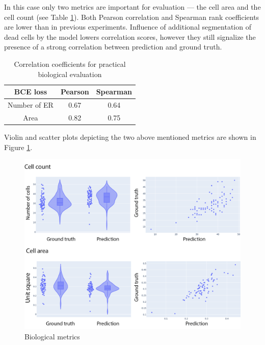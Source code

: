 In this case only two metrics are important for evaluation --- the cell area and the cell count (see Table \ref{table:gfp-metrics}). Both Pearson correlation and Spearman rank coefficients are lower than in previous experiments. Influence of additional segmentation of dead cells by the model lowers correlation scores, however they still signalize the presence of a strong correlation between prediction and ground truth. 
\begin{table}[H]
    \centering
    \caption{Correlation coefficients for practical biological evaluation}
        \begin{adjustbox}{width=0.4\textwidth}
            \begin{tabular}{|c|c|c|}\hline
                BCE loss&Pearson&Spearman
                \\\hline\hline
                Number of ER&0.67&0.64\\\hline
                Area&0.82&0.75\\\hline
            \end{tabular}
            \label{table:gfp-metrics}
        \end{adjustbox}
\end{table}

Violin and scatter plots depicting the two above mentioned metrics are shown in Figure \ref{fig:gfp-bce-metrics}.
\begin{figure}[H]
	\begin{center}
		\includegraphics[width=\linewidth]{bilder/gfp/binary-bce/gfp-bce-metrics.png}
		\caption{Biological metrics}\label{fig:gfp-bce-metrics}
	\end{center}
\end{figure}